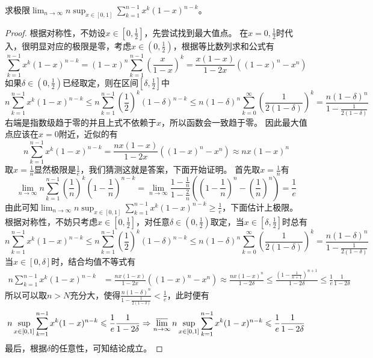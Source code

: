 \documentclass[../../main.tex]{subfiles}
\begin{document}
\begin{example}
求极限\(\lim_{n\rightarrow\infty}n\sup_{x\in[0,1]}\sum_{k = 1}^{n - 1}x^{k}(1 - x)^{n - k}\)。
\end{example}
\begin{proof}
根据对称性，不妨设\(x\in\left[0,\frac{1}{2}\right]\)，先尝试找到最大值点。
在\(x = 0,\frac{1}{2}\)时代入，很明显对应的极限是零，考虑\(x\in\left(0,\frac{1}{2}\right)\)，根据等比数列求和公式有
\[
\sum_{k = 1}^{n - 1}x^{k}(1 - x)^{n - k}=(1 - x)^{n}\sum_{k = 1}^{n - 1}\left(\frac{x}{1 - x}\right)^{k}=\frac{x(1 - x)}{1 - 2x}((1 - x)^{n}-x^{n})
\]
如果\(\delta\in\left(0,\frac{1}{2}\right)\)已经取定，则在区间\(\left[\delta,\frac{1}{2}\right]\)中
\[
n\sum_{k = 1}^{n - 1}x^{k}(1 - x)^{n - k}\leqslant  n\sum_{k = 1}^{n - 1}\left(\frac{1}{2}\right)^{k}(1 - \delta)^{n - k}\leqslant  n(1 - \delta)^{n}\sum_{k = 0}^{\infty}\left(\frac{1}{2(1 - \delta)}\right)^{k}=\frac{n(1 - \delta)^{n}}{1-\frac{1}{2(1 - \delta)}}
\]
右端是指数级趋于零的并且上式不依赖于\(x\)，所以函数会一致趋于零。
因此最大值点应该在\(x = 0\)附近，近似的有
\[
n\sum_{k = 1}^{n - 1}x^{k}(1 - x)^{n - k}=\frac{nx(1 - x)}{1 - 2x}((1 - x)^{n}-x^{n})\approx nx(1 - x)^{n}
\]
取\(x = \frac{1}{n}\)显然极限是\(\frac{1}{e}\)，我们猜测这就是答案，下面开始证明。
首先取\(x = \frac{1}{n}\)有
\[
\lim_{n\rightarrow\infty}n\sum_{k = 1}^{n - 1}\left(\frac{1}{n}\right)^{k}\left(1-\frac{1}{n}\right)^{n - k}=\lim_{n\rightarrow\infty}\frac{1-\frac{1}{n}}{1-\frac{2}{n}}\left(\left(1-\frac{1}{n}\right)^{n}-\left(\frac{1}{n}\right)^{n}\right)=\frac{1}{e}
\]
由此可知\(\lim_{n\rightarrow\infty}n\sup_{x\in[0,1]}\sum_{k = 1}^{n - 1}x^{k}(1 - x)^{n - k}\geqslant \frac{1}{e}\)，下面估计上极限。
根据对称性，不妨只考虑\(x\in\left[0,\frac{1}{2}\right]\)，对任意\(\delta\in\left(0,\frac{1}{2}\right)\)取定，当\(x\in\left[\delta,\frac{1}{2}\right]\)时总有
\[
n\sum_{k = 1}^{n - 1}x^{k}(1 - x)^{n - k}\leqslant  n\sum_{k = 1}^{n - 1}\left(\frac{1}{2}\right)^{k}(1 - \delta)^{n - k}\leqslant  n(1 - \delta)^{n}\sum_{k = 0}^{\infty}\left(\frac{1}{2(1 - \delta)}\right)^{k}=\frac{n(1 - \delta)^{n}}{1-\frac{1}{2(1 - \delta)}}
\]
当\(x\in[0,\delta]\)时，结合均值不等式有
\begin{align*}
n\sum_{k = 1}^{n - 1}x^{k}(1 - x)^{n - k}&=\frac{nx(1 - x)}{1 - 2x}((1 - x)^{n}-x^{n})\approx\frac{nx(1 - x)^{n}}{1 - 2\delta}\leqslant \frac{\left(1-\frac{1}{n + 1}\right)^{n + 1}}{1 - 2\delta}\leqslant \frac{1}{e}\frac{1}{1 - 2\delta}
\end{align*}
所以可以取\(n > N\)充分大，使得\(\frac{n(1 - \delta)^{n}}{1-\frac{1}{2(1 - \delta)}}<\frac{1}{e}\)，此时便有
\[
n\sup_{x\in[0,1]}\sum_{k = 1}^{n - 1}x^{k}(1 - x)^{n - k}\leqslant \frac{1}{e}\frac{1}{1 - 2\delta}\Rightarrow\varlimsup_{n\rightarrow\infty}n\sup_{x\in[0,1]}\sum_{k = 1}^{n - 1}x^{k}(1 - x)^{n - k}\leqslant \frac{1}{e}\frac{1}{1 - 2\delta}
\]
最后，根据\(\delta\)的任意性，可知结论成立。
\end{proof}
\end{document}
